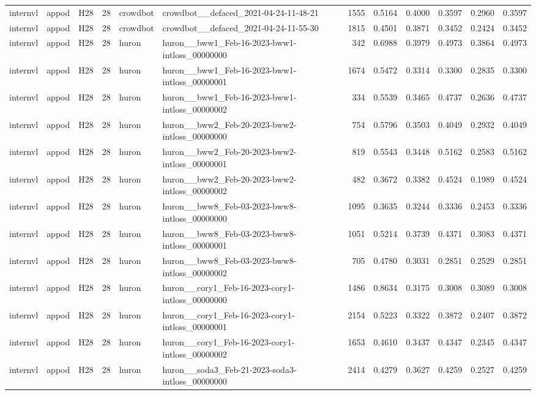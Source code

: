 \begin{table}[tbp]
\begin{tabular}{lllrllrrrrrr}
internvl & appod & H28 & 28 & crowdbot & crowdbot\_\_defaced\_2021-04-24-11-48-21 & 1555 & 0.5164 & 0.4000 & 0.3597 & 0.2960 & 0.3597 \\
internvl & appod & H28 & 28 & crowdbot & crowdbot\_\_defaced\_2021-04-24-11-55-30 & 1815 & 0.4501 & 0.3871 & 0.3452 & 0.2424 & 0.3452 \\
internvl & appod & H28 & 28 & huron & huron\_\_bww1\_Feb-16-2023-bww1-intloss\_00000000 & 342 & 0.6988 & 0.3979 & 0.4973 & 0.3864 & 0.4973 \\
internvl & appod & H28 & 28 & huron & huron\_\_bww1\_Feb-16-2023-bww1-intloss\_00000001 & 1674 & 0.5472 & 0.3314 & 0.3300 & 0.2835 & 0.3300 \\
internvl & appod & H28 & 28 & huron & huron\_\_bww1\_Feb-16-2023-bww1-intloss\_00000002 & 334 & 0.5539 & 0.3465 & 0.4737 & 0.2636 & 0.4737 \\
internvl & appod & H28 & 28 & huron & huron\_\_bww2\_Feb-20-2023-bww2-intloss\_00000000 & 754 & 0.5796 & 0.3503 & 0.4049 & 0.2932 & 0.4049 \\
internvl & appod & H28 & 28 & huron & huron\_\_bww2\_Feb-20-2023-bww2-intloss\_00000001 & 819 & 0.5543 & 0.3448 & 0.5162 & 0.2583 & 0.5162 \\
internvl & appod & H28 & 28 & huron & huron\_\_bww2\_Feb-20-2023-bww2-intloss\_00000002 & 482 & 0.3672 & 0.3382 & 0.4524 & 0.1989 & 0.4524 \\
internvl & appod & H28 & 28 & huron & huron\_\_bww8\_Feb-03-2023-bww8-intloss\_00000000 & 1095 & 0.3635 & 0.3244 & 0.3336 & 0.2453 & 0.3336 \\
internvl & appod & H28 & 28 & huron & huron\_\_bww8\_Feb-03-2023-bww8-intloss\_00000001 & 1051 & 0.5214 & 0.3739 & 0.4371 & 0.3083 & 0.4371 \\
internvl & appod & H28 & 28 & huron & huron\_\_bww8\_Feb-03-2023-bww8-intloss\_00000002 & 705 & 0.4780 & 0.3031 & 0.2851 & 0.2529 & 0.2851 \\
internvl & appod & H28 & 28 & huron & huron\_\_cory1\_Feb-16-2023-cory1-intloss\_00000000 & 1486 & 0.8634 & 0.3175 & 0.3008 & 0.3089 & 0.3008 \\
internvl & appod & H28 & 28 & huron & huron\_\_cory1\_Feb-16-2023-cory1-intloss\_00000001 & 2154 & 0.5223 & 0.3322 & 0.3872 & 0.2407 & 0.3872 \\
internvl & appod & H28 & 28 & huron & huron\_\_cory1\_Feb-16-2023-cory1-intloss\_00000002 & 1653 & 0.4610 & 0.3437 & 0.4347 & 0.2345 & 0.4347 \\
internvl & appod & H28 & 28 & huron & huron\_\_soda3\_Feb-21-2023-soda3-intloss\_00000000 & 2414 & 0.4279 & 0.3627 & 0.4259 & 0.2527 & 0.4259 \\

\end{tabular}
\end{table}
